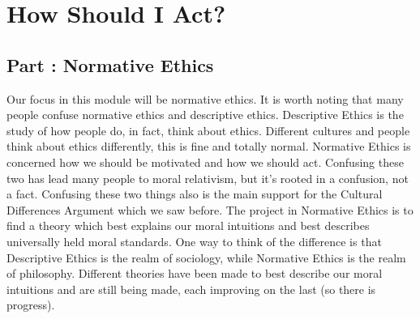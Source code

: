 \part{How Should I Act?}
\label{ch.modeight}
\chapter{Part \thechapcount: Normative Ethics}\setcounter{seccount}{1}
Our focus in this module will be normative ethics. It is worth noting that many people confuse normative ethics and descriptive ethics. Descriptive Ethics is the study of how people do, in fact, think about ethics. Different cultures and people think about ethics differently, this is fine and totally normal. Normative Ethics is concerned how we should be motivated and how we should act. Confusing these two has lead many people to moral relativism, but it's rooted in a confusion, not a fact. Confusing these two things also is the main support for the Cultural Differences Argument which we saw before. The project in Normative Ethics is to find a theory which best explains our moral intuitions and best describes universally held moral standards. One way to think of the difference is that Descriptive Ethics is the realm of sociology, while Normative Ethics is the realm of philosophy.  Different theories have been made to best describe our moral intuitions and are still being made, each improving on the last (so there is progress). 

